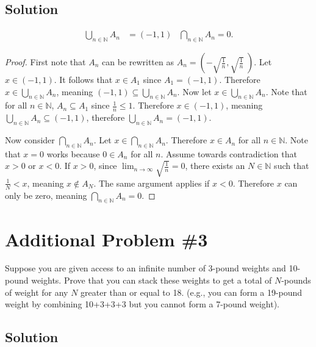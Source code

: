 \documentclass[12pt]{extarticle}
\begin{document}
\subsection*{Solution}

\begin{align*}
	\bigcup_{n \in \mathbb{N}} A_n &= (-1, 1) & \bigcap_{n \in \mathbb{N}} A_n = \qty{0}
.\end{align*}

\begin{proof}
 	First note that $A_n$ can be rewritten as $A_n = \left(-\sqrt{\frac{1}{n}}, \sqrt{\frac{1}{n}}\;\right)$. Let $x \in (-1,1)$. It follows that $x \in A_1$ since $A_1 = (-1, 1)$. Therefore $x \in \bigcup_{n \in \mathbb{N}} A_n$, meaning $(-1, 1) \subseteq \bigcup_{n \in \mathbb{N}} A_n$. Now let $x \in \bigcup_{n \in \mathbb{N}} A_n$. Note that for all $n \in \mathbb{N}$, $A_n \subseteq A_1$ since $\frac{1}{n} \leq 1$. Therefore $x \in (-1, 1)$, meaning $\bigcup_{n \in \mathbb{N}} A_n \subseteq (-1, 1)$, therefore $\bigcup_{n \in \mathbb{N}} A_n = (-1, 1)$.

	\hfill\linebreak

	Now consider $\bigcap_{n \in \mathbb{N}} A_n$. Let $x \in \bigcap_{n \in \mathbb{N}} A_n$. Therefore $x \in A_n$ for all $n \in \mathbb{N}$. Note that $x = 0$ works because $0 \in A_n$ for all $n$. Assume towards contradiction that $x > 0$ or $x < 0$. If $x>0$, since $\lim_{n \to \infty} \sqrt{\frac{1}{n}} = 0$, there exists an $N \in \mathbb{N}$ such that $\frac{1}{N} < x$, meaning $x \notin A_N$. The same argument applies if $x < 0$. Therefore $x$ can only be zero, meaning $\bigcap_{n \in \mathbb{N}} A_n = \qty{0}$.
\end{proof}

\section*{Additional Problem \#3}

Suppose you are given access to an infinite number of 3-pound weights and 10-pound weights. Prove that you can stack these weights to get a total of $N$-pounds of weight for any $N$ greater than or equal to 18. (e.g., you can form a 19-pound weight by combining 10+3+3+3 but you cannot form a 7-pound weight).

\subsection*{Solution}
\end{document}
